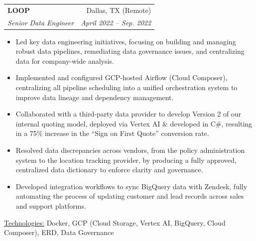 \documentclass[11pt, a4paper]{article}
\makeatletter
\newcommand{\resumeItem}[1]{%
  \item\small{
    #1
  }
}
\newcommand{\resumeSubheading}[4]{
  \vspace{8pt}\item%
    \begin{tabular*}{0.97\textwidth}[t]{l@{\extracolsep{\fill}}r}
      \textbf{#1} & #2 \\
      \textit{\small#3} & \textit{\small #4} \\
    \end{tabular*}\vspace{-5pt}
}
\newcommand{\resumeItemListStart}{\begin{itemize}}
\newcommand{\resumeItemListEnd}{\end{itemize}\vspace{-5pt}}
\newcommand{\resumeTech}[2]{
 \underline{#1:} #2
}
\makeatother
\begin{document}

\resumeSubheading
      {LOOP}{Dallas, TX (Remote)}
      {Senior Data Engineer}{April 2022 – Sep. 2022}
      \resumeItemListStart
        \resumeItem{Led key data engineering initiatives, focusing on building and managing robust data pipelines, remediating data governance issues, and centralizing data for company-wide analysis.}
        \resumeItem{Implemented and configured GCP-hosted Airflow (Cloud Composer), centralizing all pipeline scheduling into a unified orchestration system to improve data lineage and dependency management.}
        \resumeItem{Collaborated with a third-party data provider to develop Version 2 of our internal quoting model, deployed via Vertex AI \& developed in C\#, resulting in a 75\% increase in the “Sign on First Quote” conversion rate.}
        \resumeItem{Resolved data discrepancies across vendors, from the policy administration system to the location tracking provider, by producing a fully approved, centralized data dictionary to enforce clarity and governance.}
        \resumeItem{Developed integration workflows to sync BigQuery data with Zendesk, fully automating the process of updating customer and lead records across sales and support platforms.}
      \resumeItemListEnd
      \resumeTech{Technologies}{Docker, GCP (Cloud Storage, Vertex AI, BigQuery, Cloud Composer), ERD, Data Governance}\\
\end{document}
